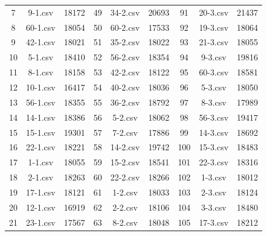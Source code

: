 \begin{longtable}{|c|c|c|c|c|c|c|c|c|}
  7           & 9-1.csv        & 18172         & 49          & 34-2.csv       & 20693         & 91          & 20-3.csv       & 21437         \\
  8           & 60-1.csv       & 18054         & 50          & 60-2.csv       & 17533         & 92          & 19-3.csv       & 18064         \\
  9           & 42-1.csv       & 18021         & 51          & 35-2.csv       & 18022         & 93          & 21-3.csv       & 18055         \\
  10          & 5-1.csv        & 18410         & 52          & 56-2.csv       & 18354         & 94          & 9-3.csv        & 19816         \\
  11          & 8-1.csv        & 18158         & 53          & 42-2.csv       & 18122         & 95          & 60-3.csv       & 18581         \\
  12          & 10-1.csv       & 16417         & 54          & 40-2.csv       & 18036         & 96          & 5-3.csv        & 18050         \\
  13          & 56-1.csv       & 18355         & 55          & 36-2.csv       & 18792         & 97          & 8-3.csv        & 17989         \\
  14          & 14-1.csv       & 18386         & 56          & 5-2.csv        & 18062         & 98          & 56-3.csv       & 19417         \\
  15          & 15-1.csv       & 19301         & 57          & 7-2.csv        & 17886         & 99          & 14-3.csv       & 18692         \\
  16          & 22-1.csv       & 18221         & 58          & 14-2.csv       & 19742         & 100         & 15-3.csv       & 18483         \\
  17          & 1-1.csv        & 18055         & 59          & 15-2.csv       & 18541         & 101         & 22-3.csv       & 18316         \\
  18          & 2-1.csv        & 18263         & 60          & 22-2.csv       & 18266         & 102         & 1-3.csv        & 18012         \\
  19          & 17-1.csv       & 18121         & 61          & 1-2.csv        & 18033         & 103         & 2-3.csv        & 18124         \\
  20          & 12-1.csv       & 16919         & 62          & 2-2.csv        & 18106         & 104         & 3-3.csv        & 18480         \\
  21          & 23-1.csv       & 17567         & 63          & 8-2.csv        & 18048         & 105         & 17-3.csv       & 18212         \\

\end{longtable}
